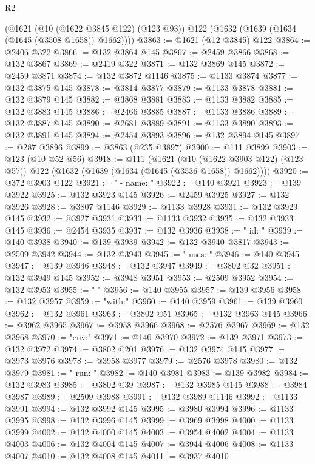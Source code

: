\begin{lexlean}{R2}
\begin{coremodule}
    (@1621
      (@10 (@1622 @3845 @122) (@123 @93))
      @122
      (@1632 (@1639 (@1634 (@1645 (@3508 @1658)) @1662))))
@3863 := @1621 (@12 @3845) @122
@3864 := @2406 @322
@3866 := @132 @3864 @145
@3867 := @2459 @3866
@3868 := @132 @3867
@3869 := @2419 @322
@3871 := @132 @3869 @145
@3872 := @2459 @3871
@3874 := @132 @3872 @1146
@3875 := @1133 @3874
@3877 := @132 @3875 @145
@3878 := @3814 @3877
@3879 := @1133 @3878
@3881 := @132 @3879 @145
@3882 := @3868 @3881
@3883 := @1133 @3882
@3885 := @132 @3883 @145
@3886 := @2466 @3885
@3887 := @1133 @3886
@3889 := @132 @3887 @145
@3890 := @2681 @3889
@3891 := @1133 @3890
@3893 := @132 @3891 @145
@3894 := @2454 @3893
@3896 := @132 @3894 @145
@3897 := @287 @3896
@3899 := @3863 (@235 @3897)
@3900 := @111 @3899
@3903 := @123 (@10 @52 @56)
@3918 := @111
    (@1621
      (@10 (@1622 @3903 @122) (@123 @57))
      @122
      (@1632 (@1639 (@1634 (@1645 (@3536 @1658)) @1662))))
@3920 := @372 @3903 @122
@3921 := "      - name: "
@3922 := @140 @3921
@3923 := @139 @3922
@3925 := @132 @3923 @145
@3926 := @2459 @3925
@3927 := @132 @3926
@3928 := @3807 @1146
@3929 := @1133 @3928
@3931 := @132 @3929 @145
@3932 := @3927 @3931
@3933 := @1133 @3932
@3935 := @132 @3933 @145
@3936 := @2454 @3935
@3937 := @132 @3936
@3938 := "        id: "
@3939 := @140 @3938
@3940 := @139 @3939
@3942 := @132 @3940 @3817
@3943 := @2509 @3942
@3944 := @132 @3943
@3945 := "        uses: "
@3946 := @140 @3945
@3947 := @139 @3946
@3948 := @132 @3947
@3949 := @3802 @32
@3951 := @132 @3949 @145
@3952 := @3948 @3951
@3953 := @2509 @3952
@3954 := @132 @3953
@3955 := "        "
@3956 := @140 @3955
@3957 := @139 @3956
@3958 := @132 @3957
@3959 := "with:"
@3960 := @140 @3959
@3961 := @139 @3960
@3962 := @132 @3961
@3963 := @3802 @51
@3965 := @132 @3963 @145
@3966 := @3962 @3965
@3967 := @3958 @3966
@3968 := @2576 @3967
@3969 := @132 @3968
@3970 := "env:"
@3971 := @140 @3970
@3972 := @139 @3971
@3973 := @132 @3972
@3974 := @3802 @201
@3976 := @132 @3974 @145
@3977 := @3973 @3976
@3978 := @3958 @3977
@3979 := @2576 @3978
@3980 := @132 @3979
@3981 := "        run: "
@3982 := @140 @3981
@3983 := @139 @3982
@3984 := @132 @3983
@3985 := @3802 @39
@3987 := @132 @3985 @145
@3988 := @3984 @3987
@3989 := @2509 @3988
@3991 := @132 @3989 @1146
@3992 := @1133 @3991
@3994 := @132 @3992 @145
@3995 := @3980 @3994
@3996 := @1133 @3995
@3998 := @132 @3996 @145
@3999 := @3969 @3998
@4000 := @1133 @3999
@4002 := @132 @4000 @145
@4003 := @3954 @4002
@4004 := @1133 @4003
@4006 := @132 @4004 @145
@4007 := @3944 @4006
@4008 := @1133 @4007
@4010 := @132 @4008 @145
@4011 := @3937 @4010

\end{coremodule}
\end{lexlean}
